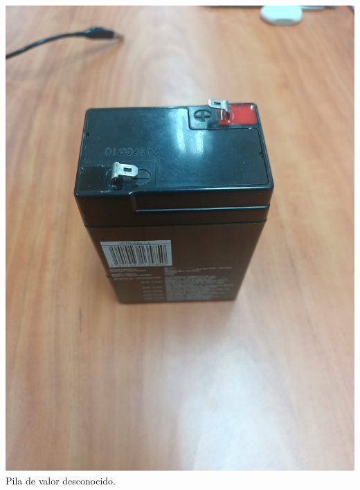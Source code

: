 \documentclass[10pt]{article}
\begin{document}
\begin{multicols}{2}
\begin{center}
	\includegraphics[scale = 0.1]{Imagenes/Material/PilaDes.jpeg}\\
	Pila de valor desconocido.


\end{center}
\end{multicols}
\end{document}
